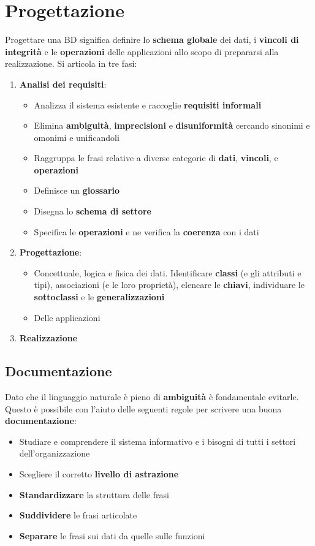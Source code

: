 \newpage
\section{Progettazione}
Progettare una BD significa definire lo \textbf{schema globale} dei dati, i \textbf{vincoli di integrità} e le \textbf{operazioni} delle applicazioni allo scopo di prepararsi alla realizzazione. Si articola in tre fasi:
\begin{enumerate}
	\item \textbf{Analisi dei requisiti}:
	\begin{itemize}
		\item Analizza il sistema esistente e raccoglie \textbf{requisiti informali}
		\item Elimina \textbf{ambiguità}, \textbf{imprecisioni} e \textbf{disuniformità} cercando sinonimi e omonimi e unificandoli
		\item Raggruppa le frasi relative a diverse categorie di \textbf{dati}, \textbf{vincoli}, e \textbf{operazioni}
		\item Definisce un \textbf{glossario}
		\item Disegna lo \textbf{schema di settore}
		\item Specifica le \textbf{operazioni} e ne verifica la \textbf{coerenza} con i dati
	\end{itemize}
	\item \textbf{Progettazione}:
	\begin{itemize}
		\item Concettuale, logica e fisica dei dati. Identificare \textbf{classi} (e gli attributi e tipi), associazioni (e le loro proprietà), elencare le \textbf{chiavi}, individuare le \textbf{sottoclassi} e le \textbf{generalizzazioni}
		\item Delle applicazioni
	\end{itemize}
	\item \textbf{Realizzazione}
\end{enumerate}

\subsection{Documentazione}
Dato che il linguaggio naturale è pieno di \textbf{ambiguità} è fondamentale evitarle. Questo è possibile con l'aiuto delle seguenti regole per scrivere una buona \textbf{documentazione}:
\begin{itemize}
	\item Studiare e comprendere il sistema informativo e i bisogni di tutti i settori dell'organizzazione
	\item Scegliere il corretto \textbf{livello di astrazione}
	\item \textbf{Standardizzare} la struttura delle frasi
	\item \textbf{Suddividere} le frasi articolate
	\item \textbf{Separare} le frasi sui dati da quelle sulle funzioni
\end{itemize}

